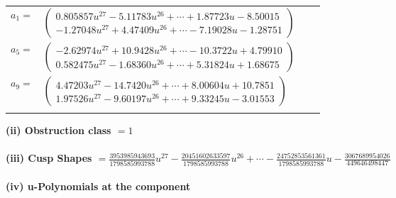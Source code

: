 \documentclass[1p]{elsarticle_modified}
\theoremstyle{definition}
\begin{document}
\begin{tabular}{m{7pt} m{180pt} m{7pt} m{180pt} }
\flushright $a_{1}=$&$\begin{pmatrix}0.805857 u^{27}-5.11783 u^{26}+\cdots+1.87723 u-8.50015\\-1.27048 u^{27}+4.47409 u^{26}+\cdots-7.19028 u-1.28751\end{pmatrix}$ \\
\flushright $a_{5}=$&$\begin{pmatrix}-2.62974 u^{27}+10.9428 u^{26}+\cdots-10.3722 u+4.79910\\0.582475 u^{27}-1.68360 u^{26}+\cdots+5.31824 u+1.68675\end{pmatrix}$ \\
\flushright $a_{9}=$&$\begin{pmatrix}4.47203 u^{27}-14.7420 u^{26}+\cdots+8.00604 u+10.7851\\1.97526 u^{27}-9.60197 u^{26}+\cdots+9.33245 u-3.01553\end{pmatrix}$\\&\end{tabular}
\flushleft \textbf{(ii) Obstruction class $= 1$}\\~\\
\flushleft \textbf{(iii) Cusp Shapes $= \frac{3953985943693}{1798585993788} u^{27}-\frac{20451602633597}{1798585993788} u^{26}+\cdots-\frac{24752853561361}{1798585993788} u-\frac{3067689954026}{449646498447}$}\\~\\
\newpage\renewcommand{\arraystretch}{1}
\flushleft \textbf{(iv) u-Polynomials at the component}\newline \\
\end{document}
